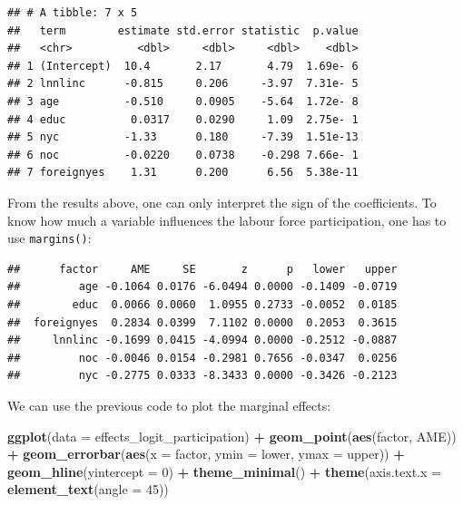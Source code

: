 \documentclass[]{gitbook}
\newenvironment{Shaded}{\begin{snugshade}}{\end{snugshade}}
\newcommand{\DataTypeTok}[1]{\textcolor[rgb]{0.13,0.29,0.53}{#1}}
\newcommand{\DecValTok}[1]{\textcolor[rgb]{0.00,0.00,0.81}{#1}}
\newcommand{\KeywordTok}[1]{\textcolor[rgb]{0.13,0.29,0.53}{\textbf{#1}}}
\newcommand{\NormalTok}[1]{#1}
\newcommand{\OperatorTok}[1]{\textcolor[rgb]{0.81,0.36,0.00}{\textbf{#1}}}
\newcommand{\StringTok}[1]{\textcolor[rgb]{0.31,0.60,0.02}{#1}}
\begin{document}
\begin{verbatim}
## # A tibble: 7 x 5
##   term        estimate std.error statistic  p.value
##   <chr>          <dbl>     <dbl>     <dbl>    <dbl>
## 1 (Intercept)  10.4       2.17       4.79  1.69e- 6
## 2 lnnlinc      -0.815     0.206     -3.97  7.31e- 5
## 3 age          -0.510     0.0905    -5.64  1.72e- 8
## 4 educ          0.0317    0.0290     1.09  2.75e- 1
## 5 nyc          -1.33      0.180     -7.39  1.51e-13
## 6 noc          -0.0220    0.0738    -0.298 7.66e- 1
## 7 foreignyes    1.31      0.200      6.56  5.38e-11
\end{verbatim}

From the results above, one can only interpret the sign of the coefficients. To know how much a
variable influences the labour force participation, one has to use \texttt{margins()}:

\begin{Shaded}
\end{Shaded}

\begin{verbatim}
##      factor     AME     SE       z      p   lower   upper
##         age -0.1064 0.0176 -6.0494 0.0000 -0.1409 -0.0719
##        educ  0.0066 0.0060  1.0955 0.2733 -0.0052  0.0185
##  foreignyes  0.2834 0.0399  7.1102 0.0000  0.2053  0.3615
##     lnnlinc -0.1699 0.0415 -4.0994 0.0000 -0.2512 -0.0887
##         noc -0.0046 0.0154 -0.2981 0.7656 -0.0347  0.0256
##         nyc -0.2775 0.0333 -8.3433 0.0000 -0.3426 -0.2123
\end{verbatim}

We can use the previous code to plot the marginal effects:

\begin{Shaded}
\begin{Highlighting}[]
\KeywordTok{ggplot}\NormalTok{(}\DataTypeTok{data =}\NormalTok{ effects_logit_participation) }\OperatorTok{+}
\StringTok{  }\KeywordTok{geom_point}\NormalTok{(}\KeywordTok{aes}\NormalTok{(factor, AME)) }\OperatorTok{+}
\StringTok{  }\KeywordTok{geom_errorbar}\NormalTok{(}\KeywordTok{aes}\NormalTok{(}\DataTypeTok{x =}\NormalTok{ factor, }\DataTypeTok{ymin =}\NormalTok{ lower, }\DataTypeTok{ymax =}\NormalTok{ upper)) }\OperatorTok{+}
\StringTok{  }\KeywordTok{geom_hline}\NormalTok{(}\DataTypeTok{yintercept =} \DecValTok{0}\NormalTok{) }\OperatorTok{+}
\StringTok{  }\KeywordTok{theme_minimal}\NormalTok{() }\OperatorTok{+}
\StringTok{  }\KeywordTok{theme}\NormalTok{(}\DataTypeTok{axis.text.x =} \KeywordTok{element_text}\NormalTok{(}\DataTypeTok{angle =} \DecValTok{45}\NormalTok{))}
\end{Highlighting}
\end{Shaded}
\end{document}
